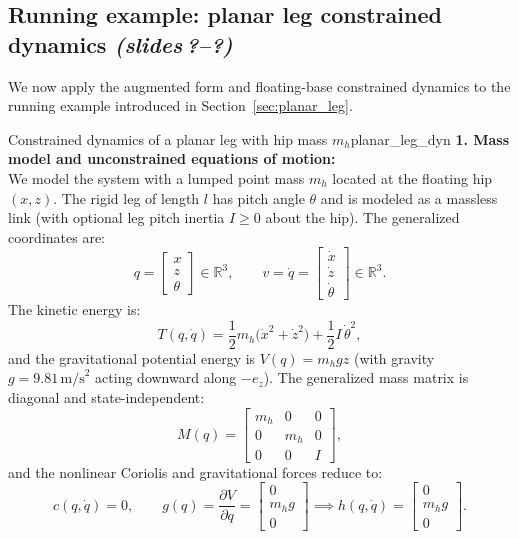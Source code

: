\documentclass[11pt,a4paper]{article}
\newcommand{\R}{\mathbb{R}}
\newcommand{\sr}{\emph{(slides\,?--?)}}
\begin{document}
\subsection{Running example: planar leg constrained dynamics \sr}\label{sec:planar_leg_dyn}

We now apply the augmented form and floating-base constrained dynamics to the running example introduced in Section~\ref{sec:planar_leg}.

\begin{example}{Constrained dynamics of a planar leg with hip mass $m_h$}{planar_leg_dyn}
\textbf{1. Mass model and unconstrained equations of motion:}\\
We model the system with a lumped point mass $m_h$ located at the floating hip $(x, z)$. The rigid leg of length $l$ has pitch angle $\theta$ and is modeled as a massless link (with optional leg pitch inertia $I \ge 0$ about the hip). The generalized coordinates are:
\[
  q = \begin{bmatrix} x \\ z \\ \theta \end{bmatrix} \in \R^3, \qquad
  v = \dot q = \begin{bmatrix} \dot x \\ \dot z \\ \dot\theta \end{bmatrix} \in \R^3.
\]
The kinetic energy is:
\begin{equation}
  T(q,\dot q) = \frac{1}{2}m_h\big(\dot x^2 + \dot z^2\big) + \frac{1}{2}I\,\dot\theta^2,
\end{equation}
and the gravitational potential energy is $V(q) = m_h g z$ (with gravity $g = 9.81\,\text{m/s}^2$ acting downward along $-e_z$). The generalized mass matrix is diagonal and state-independent:
\begin{equation}
  M(q) = \begin{bmatrix} m_h & 0 & 0 \\ 0 & m_h & 0 \\ 0 & 0 & I \end{bmatrix},
\end{equation}
and the nonlinear Coriolis and gravitational forces reduce to:
\begin{equation}
  c(q,\dot q) = 0, \qquad g(q) = \frac{\partial V}{\partial q} = \begin{bmatrix} 0 \\ m_h g \\ 0 \end{bmatrix} \implies h(q,\dot q) = \begin{bmatrix} 0 \\ m_h g \\ 0 \end{bmatrix}.

\end{equation}
\end{example}
\end{document}

